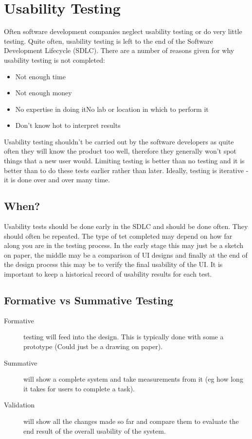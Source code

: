 
\section{Usability Testing}

Often software development companies neglect usability testing or do very little testing. Quite often, usability testing is left to the end of the Software Development Lifecycle (SDLC). There are a number of reasons given for why usability testing is not completed:
\begin{itemize}
    \item Not enough time
    \item Not enough money
    \item No expertise in doing itNo lab or location in which to perform it
    \item Don't know hot to interpret results
\end{itemize}

Usability testing shouldn't be carried out by the software developers as quite often they will know the product too well, therefore they generally won't spot things that a new user would. Limiting testing is better than no testing and it is better than to do these tests earlier rather than later. Ideally, testing is iterative - it is done over and over many time. 

\subsection{When?}
Usability tests should be done early in the SDLC and should be done often. They should often be repeated. The type of tet completed may depend on how far along you are in the testing process. In the early stage this may just be a sketch on paper, the middle may be a comparison of UI designs and finally at the end of the design process this may be to verify the final usability of the UI.
It is important to keep a historical record of usability results for each test. 

\subsection{Formative vs Summative Testing}
\begin{description}
    \item[Formative] testing will feed into the design. This is typically done with some a prototype (Could just be a drawing on paper).
    \item[Summative] will show a complete system and take measurements from it (eg how long it takes for users to complete a task). 
    \item[Validation] will show all the changes made so far and compare them to evaluate the end result of the overall usability of the system. 
\end{description}

